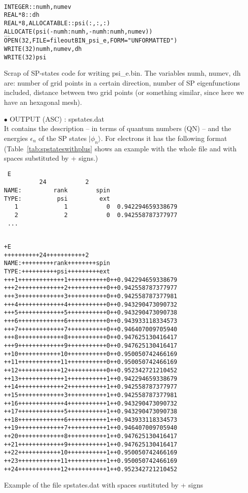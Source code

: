 \documentclass[12pt,twoside]{article}
\begin{document}
\begin{table}
\begin{alltt}
\ \\
INTEGER :: numh, numev
REAL*8 :: dh
REAL*8, ALLOCATABLE :: psi(:,:,:)
ALLOCATE(psi(-numh:numh, -numh:numh, numev))
\( \dots \)
OPEN(32, FILE=fileoutBIN_psi_e, FORM="UNFORMATTED")
WRITE(32) numh, numev, dh
WRITE(32) psi
\end{alltt}
\caption{Scrap of SP-states code for writing \textsf{psi\_e.bin}.
The variables \textsf{numh, numev, dh} are: number of grid points in a certain direction,
number of SP eigenfunctions included, distance between two grid points (or something
similar, since here we have an hexagonal mesh).
} 
\label{tab:wrstic2Dhex}
\end{table}


$\bullet$ \textsf{OUTPUT (ASC) : spstates.dat} 
\\ 
It contains the description -- in terms of quantum numbers (QN) -- and
the energies $\epsilon_n$ of the SP states $|\phi_n\rangle$.  For
electrons it has the following format (Table~\ref{tab:spstateswithplus}
shows an example with the whole file and with spaces substituted by
\textsf{+} signs.)
\begin{verbatim}
 E
          24           2
NAME:         rank        spin
TYPE:          psi         ext
   1             1           0  0.942294659338679
   2             2           0  0.942558787377977
 ...
\end{verbatim}


\begin{table}
\begin{alltt}
\ \\
+E 
++++++++++24+++++++++++2 
NAME:+++++++++rank++++++++spin
TYPE:++++++++++psi+++++++++ext
+++1+++++++++++++1+++++++++++0++0.942294659338679
+++2+++++++++++++2+++++++++++0++0.942558787377977
+++3+++++++++++++3+++++++++++0++0.942558787377981
+++4+++++++++++++4+++++++++++0++0.943290473090732
+++5+++++++++++++5+++++++++++0++0.943290473090738
+++6+++++++++++++6+++++++++++0++0.943933118334573
+++7+++++++++++++7+++++++++++0++0.946407009705940
+++8+++++++++++++8+++++++++++0++0.947625130416417
+++9+++++++++++++9+++++++++++0++0.947625130416417
++10++++++++++++10+++++++++++0++0.950050742466169
++11++++++++++++11+++++++++++0++0.950050742466169
++12++++++++++++12+++++++++++0++0.952342721210452
++13+++++++++++++1+++++++++++1++0.942294659338679
++14+++++++++++++2+++++++++++1++0.942558787377977
++15+++++++++++++3+++++++++++1++0.942558787377981
++16+++++++++++++4+++++++++++1++0.943290473090732
++17+++++++++++++5+++++++++++1++0.943290473090738
++18+++++++++++++6+++++++++++1++0.943933118334573
++19+++++++++++++7+++++++++++1++0.946407009705940
++20+++++++++++++8+++++++++++1++0.947625130416417
++21+++++++++++++9+++++++++++1++0.947625130416417
++22++++++++++++10+++++++++++1++0.950050742466169
++23++++++++++++11+++++++++++1++0.950050742466169
++24++++++++++++12+++++++++++1++0.952342721210452
\end{alltt}
\caption{Example of the file \textsf{spstates.dat} with spaces
sustituted by \textsf{+} signs} 
\label{tab:spstateswithplus}
\end{table}
\end{document}
